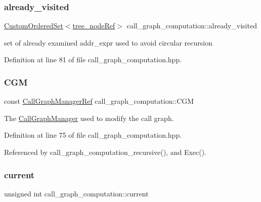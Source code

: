 \subsubsection{\texorpdfstring{already\+\_\+visited}{already\_visited}}
{\footnotesize\ttfamily \hyperlink{classCustomOrderedSet}{Custom\+Ordered\+Set}$<$\hyperlink{tree__node_8hpp_a6ee377554d1c4871ad66a337eaa67fd5}{tree\+\_\+node\+Ref}$>$ call\+\_\+graph\+\_\+computation\+::already\+\_\+visited\hspace{0.3cm}{\ttfamily [private]}}



set of already examined addr\+\_\+expr used to avoid circular recursion 



Definition at line 81 of file call\+\_\+graph\+\_\+computation.\+hpp.

\mbox{\label{classcall__graph__computation_a0fc3513c7a0653b51c5a8b9f5607e3a5}} 
\subsubsection{\texorpdfstring{C\+GM}{CGM}}
{\footnotesize\ttfamily const \hyperlink{call__graph__manager_8hpp_aefd741adcd456a04c45fd3df98acdb2c}{Call\+Graph\+Manager\+Ref} call\+\_\+graph\+\_\+computation\+::\+C\+GM\hspace{0.3cm}{\ttfamily [private]}}



The \hyperlink{classCallGraphManager}{Call\+Graph\+Manager} used to modify the call graph. 



Definition at line 75 of file call\+\_\+graph\+\_\+computation.\+hpp.



Referenced by call\+\_\+graph\+\_\+computation\+\_\+recursive(), and Exec().

\mbox{\label{classcall__graph__computation_a100a2728b8a5952e3e969c1beeb7a883}} 
\subsubsection{\texorpdfstring{current}{current}}
{\footnotesize\ttfamily unsigned int call\+\_\+graph\+\_\+computation\+::current\hspace{0.3cm}{\ttfamily [private]}}



